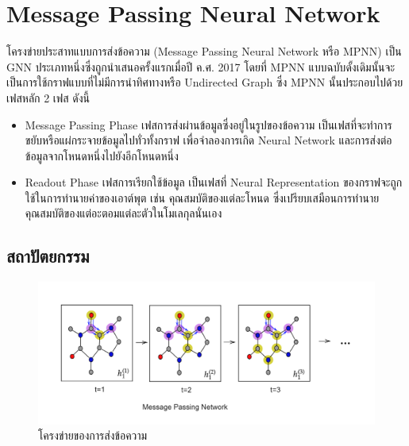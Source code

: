 \section{Message Passing Neural Network}
\label{sec:mpnn}

โครงข่ายประสาทแบบการส่งข้อความ (Message Passing Neural Network หรือ MPNN) เป็น GNN ประเภทหนึ่งซึ่งถูกนำเสนอครั้งแรกเมื่อปี 
ค.ศ. 2017\autocite{gilmer2017} โดยที่ MPNN แบบฉบับดั้งเดิมนั้นจะเป็นการใช้กราฟแบบที่ไม่มีการนำทิศทางหรือ Undirected Graph
ซึ่ง MPNN นั้นประกอบไปด้วยเฟสหลัก 2 เฟส ดังนี้ 

\begin{itemize}
    \item Message Passing Phase เฟสการส่งผ่านข้อมูลซึ่งอยู่ในรูปของข้อความ เป็นเฟสที่จะทำการขยับหรือแผ่กระจายข้อมูลไปทั่วทั้งกราฟ%
    เพื่อจำลองการเกิด Neural Network และการส่งต่อข้อมูลจากโหนดหนึ่งไปยังอีกโหนดหนึ่ง
    
    \item Readout Phase เฟสการเรียกใช้ข้อมูล เป็นเฟสที่ Neural Representation ของกราฟจะถูกใช้ในการทำนายค่าของเอาต์พุต เช่น
    คุณสมบัติของแต่ละโหนด ซึ่งเปรียบเสมือนการทำนายคุณสมบัติของแต่อะตอมแต่ละตัวในโมเลกุลนั่นเอง
\end{itemize}

\subsection{สถาปัตยกรรม}
\label{ssec:mpnn_architect}

\begin{figure}[htbp]
    \centering
    \includegraphics[width=\linewidth]{fig/mp-network.png}
    \caption{โครงข่ายของการส่งข้อความ}
    \label{fig:mp_network}
\end{figure}

